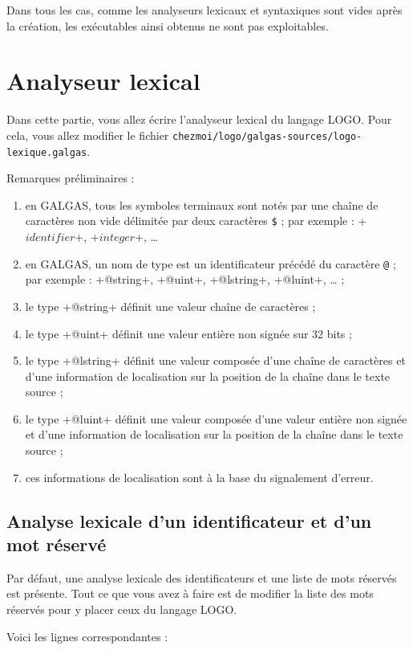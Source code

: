 Dans tous les cas, comme les analyseurs lexicaux et syntaxiques sont vides après la création, les exécutables ainsi obtenus ne sont pas exploitables.


\section {Analyseur lexical}


Dans cette partie, vous allez écrire l’analyseur lexical du langage LOGO. Pour cela, vous allez modifier le fichier \texttt{chezmoi/logo/galgas-sources/logo-lexique.galgas}.

Remarques préliminaires :
\begin{enumerate}
  \item en GALGAS, tous les symboles terminaux sont notés par une chaîne de caractères non vide délimitée par deux caractères \texttt{\$} ; par exemple : \ggs+$identifier$+, \ggs+$integer$+, … 
  \item en GALGAS, un nom de type est un identificateur précédé du caractère \texttt{@} ; par exemple : \ggs+@string+, \ggs+@uint+, \ggs+@lstring+, \ggs+@luint+, … ;
  \item le type \ggs+@string+ définit une valeur chaîne de caractères ;
  \item le type \ggs+@uint+ définit une valeur entière non signée sur 32 bits ;
  \item le type \ggs+@lstring+ définit une valeur composée d'une chaîne de caractères et d'une information de localisation sur la position de la chaîne dans le texte source ;
  \item le type \ggs+@luint+ définit une valeur composée d'une valeur entière non signée et d'une information de localisation sur la position de la chaîne dans le texte source ;
  \item ces informations de localisation sont à la base du signalement d'erreur.
\end{enumerate}

\subsection{Analyse lexicale d'un identificateur et d'un mot réservé}

Par défaut, une analyse lexicale des identificateurs et une liste de mots réservés est présente. Tout ce que vous avez à faire est de modifier la liste des mots réservés pour y placer ceux du langage LOGO.

Voici les lignes correspondantes :

